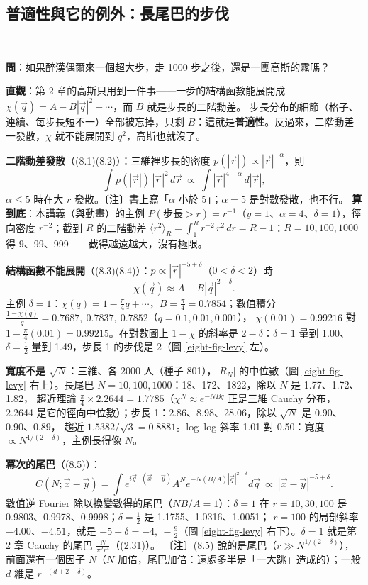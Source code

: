 \subsection{普適性與它的例外：長尾巴的步伐}
\leavevmode{}\ \par\nopagebreak

\textbf{問}：如果醉漢偶爾來一個超大步，走 1000 步之後，還是一團高斯的霧嗎？

\textbf{直觀}：第 2 章的高斯只用到一件事——一步的結構函數能展開成 $\chi(\vec q)=A-B|\vec q|^2+\cdots$，而 $B$ 就是步長的二階動差。
步長分布的細節（格子、連續、每步長短不一）全部被忘掉，只剩 $B$：這就是\textbf{普適性}。反過來，二階動差一發散，$\chi$ 就不能展開到 $q^2$，高斯也就沒了。

\textbf{二階動差發散}（(8.1)(8.2)）：三維裡步長的密度 $p(|\vec r|)\propto|\vec r|^{-\alpha}$，則
\[\int p(|\vec r|)\,|\vec r|^2\,d\vec r\ \propto\ \int|\vec r|^{4-\alpha}\,d|\vec r|,\tag{8.2}\]
$\alpha\le5$ 時在大 $r$ 發散。〔注〕書上寫「$\alpha$ 小於 5」；$\alpha=5$ 是對數發散，也不行。
\textbf{算到底}：本講義（與動畫）的主例 $P(\text{步長}>r)=r^{-1}$（$y=1$、$\alpha=4$、$\delta=1$），徑向密度 $r^{-2}$；截到 $R$ 的二階動差
$\langle r^2\rangle_R=\int_1^Rr^{-2}\,r^2\,dr=R-1$：$R=10,100,1000$ 得 9、99、999——截得越遠越大，沒有極限。

\textbf{結構函數不能展開}（(8.3)(8.4)）：$p\propto|\vec r|^{-5+\delta}$（$0<\delta<2$）時
\[\chi(\vec q)\approx A-B|\vec q|^{2-\delta}.\tag{8.4}\]
主例 $\delta=1$：$\chi(q)=1-\frac\pi4q+\cdots$，$B=\frac\pi4=0.7854$；數值積分 $\frac{1-\chi(q)}q=0.7687,\ 0.7837,\ 0.7852$（$q=0.1,0.01,0.001$），
$\chi(0.01)=0.99216$ 對 $1-\frac\pi4(0.01)=0.99215$。在對數圖上 $1-\chi$ 的斜率是 $2-\delta$：$\delta=1$ 量到 1.00、$\delta=\frac12$ 量到 1.49，步長 1 的步伐是 2（圖 \ref{eight-fig-levy} 左）。

\textbf{寬度不是 $\sqrt N$}：三維、各 2000 人（種子 801），$|R_N|$ 的中位數（圖 \ref{eight-fig-levy} 右上）。長尾巴 $N=10,100,1000$：18、172、1822，除以 $N$ 是 1.77、1.72、1.82，
趨近理論 $\frac\pi4\times2.2644=1.7785$（$\chi^N\approx e^{-NBq}$ 正是三維 Cauchy 分布，2.2644 是它的徑向中位數）；步長 1：2.86、8.98、28.06，除以 $\sqrt N$ 是 0.90、0.90、0.89，
趨近 $1.5382/\sqrt3=0.8881$。log--log 斜率 1.01 對 0.50：寬度 $\propto N^{1/(2-\delta)}$，主例長得像 $N$。

\textbf{冪次的尾巴}（(8.5)）：
\[C(N;\vec x-\vec y)=\int e^{i\vec q\cdot(\vec x-\vec y)}A^Ne^{-N(B/A)|\vec q|^{2-\delta}}d\vec q\ \propto\ |\vec x-\vec y|^{-5+\delta}.\tag{8.5}\]
數值逆 Fourier 除以換變數得的尾巴（$NB/A=1$）：$\delta=1$ 在 $r=10,30,100$ 是 0.9803、0.9978、0.9998；$\delta=\frac12$ 是 1.1755、1.0316、1.0051；
$r=100$ 的局部斜率 $-4.00$、$-4.51$，就是 $-5+\delta=-4,\ -\frac92$（圖 \ref{eight-fig-levy} 右下）。$\delta=1$ 就是第 2 章 Cauchy 的尾巴 $\frac{N}{\pi^2r^4}$（(2.31)）。
〔注〕(8.5) 說的是尾巴（$r\gg N^{1/(2-\delta)}$），前面還有一個因子 $N$（$N$ 加倍，尾巴加倍：遠處多半是「一大跳」造成的）；一般 $d$ 維是 $r^{-(d+2-\delta)}$。

